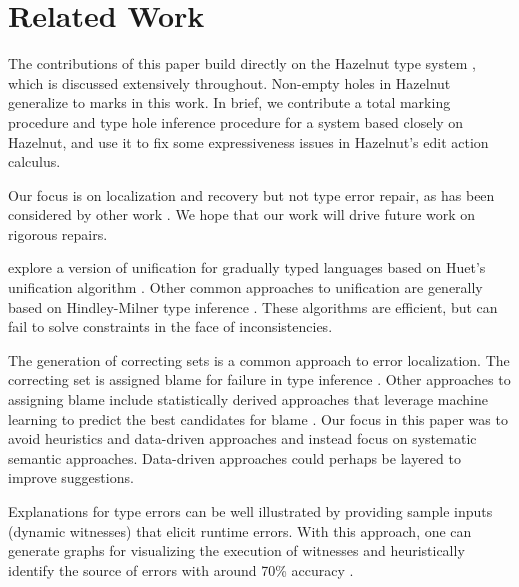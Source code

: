 \section{Related Work}
\label{sec:related}

The contributions of this paper build directly on the Hazelnut type system \cite{HazelnutPOPL}, which is discussed extensively throughout. Non-empty holes in Hazelnut generalize to marks in this work. In brief, we contribute a total marking procedure and type hole inference procedure for a system based closely on Hazelnut, and use it to fix some expressiveness issues in Hazelnut's edit action calculus.

Our focus is on localization and recovery but not type error repair, as has been considered by other work \cite{lerner07}. We hope that our work will drive future work on rigorous repairs.

\citet{GradualInfer} explore a version of unification for gradually typed languages based on Huet's unification algorithm \cite{Huet}. Other common approaches to unification are generally based on Hindley-Milner type inference \cite{MilnerInfer}. These algorithms are efficient, but can fail to solve constraints in the face of inconsistencies.


The generation of correcting sets is a common approach to error localization. The correcting set is assigned blame for failure in type inference \cite{sherrloc, typeinferDif, Pavlinovic2015}. Other approaches to assigning blame include statistically derived approaches that leverage machine learning to predict the best candidates for blame \cite{SeidelBlame}. Our focus in this paper was to avoid heuristics and data-driven approaches and instead focus on systematic semantic approaches. Data-driven approaches could perhaps be layered to improve suggestions.

Explanations for type errors can be well illustrated by providing sample inputs (dynamic witnesses) that elicit runtime errors. With this approach, one can generate graphs for visualizing the execution of witnesses and heuristically identify the source of errors with around 70\% accuracy \cite{Seidel2016}.